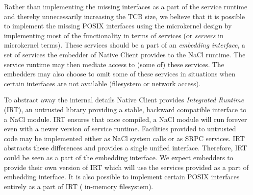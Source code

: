 Rather than implementing the missing interfaces as a part of the service
runtime and thereby unnecessarily increasing the TCB size, we believe
that it is possible to implement the missing POSIX interfaces using the
microkernel design by implementing most of the functionality in terms of
services (or \emph{servers} in microkernel terms).  These services
should be a part of an \emph{embedding interface}, a set of services the
embedder of Native Client provides to the NaCl runtime. The service
runtime may then mediate access to (some of) these services. The
embedders may also choose to  omit some of these services in situations
when certain interfaces are not available (\eg filesystem or network
access).

To abstract away the internal details Native Client provides
\emph{Integrated Runtime} (IRT), an untrusted library providing a
stable, backward compatible interface to a NaCl module. IRT ensures that
once compiled, a NaCl module will run forever even with a newer version
of service runtime. Facilities provided to untrusted code may be
implemented either as NaCl system calls or as SRPC services. IRT
abstracts these differences and provides a single unified interface.
Therefore, IRT could be seen as a part of the embedding interface. We
expect embedders to provide their own version of IRT which will use the
services provided as a part of embedding interface. It is also possible
to implement certain POSIX interfaces entirely as a part of IRT (\eg
in-memory filesystem).





